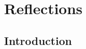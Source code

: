 \documentclass{l3proj}
\begin{document}

\section{Reflections}
\label{sec:reflections}



\subsection{Introduction}
\label{sec:leadreflection}

%
% 
%
%
\end{document}
